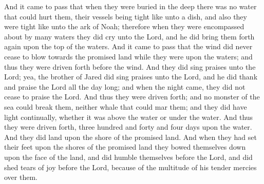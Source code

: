 \bverse \iffalse And it came to pass that when they were buried in the deep there was no water that could hurt them, their vessels being tight like unto a dish, and also they were tight like unto the ark of Noah; therefore when they were encompassed about by many waters they did cry unto the Lord, and he did bring them forth again upon the top of the waters. \fi
And it came to pass that when they were buried in the deep there was no water that could hurt them, their vessels being tight like unto a dish, and also they were tight like unto the ark of Noah; therefore when they were encompassed about by many waters they did cry unto the Lord, and he did bring them forth again upon the top of the waters.
\bverse \iffalse And it came to pass that the wind did never cease to blow towards the promised land while they were upon the waters; and thus they were driven forth before the wind. \fi
And it came to pass that the wind did never cease to blow towards the promised land while they were upon the waters; and thus they were driven forth before the wind.
\bverse \iffalse And they did sing praises unto the Lord; yea, the brother of Jared did sing praises unto the Lord, and he did thank and praise the Lord all the day long; and when the night came, they did not cease to praise the Lord. \fi
And they did sing praises unto the Lord; yea, the brother of Jared did sing praises unto the Lord, and he did thank and praise the Lord all the day long; and when the night came, they did not cease to praise the Lord.
\bverse \iffalse And thus they were driven forth; and no monster of the sea could break them, neither whale that could mar them; and they did have light continually, whether it was above the water or under the water. \fi
And thus they were driven forth; and no monster of the sea could break them, neither whale that could mar them; and they did have light continually, whether it was above the water or under the water.
\bverse \iffalse And thus they were driven forth, three hundred and forty and four days upon the water. \fi
And thus they were driven forth, three hundred and forty and four days upon the water.
\bverse \iffalse And they did land upon the shore of the promised land. And when they had set their feet upon the shores of the promised land they bowed themselves down upon the face of the land, and did humble themselves before the Lord, and did shed tears of joy before the Lord, because of the multitude of his tender mercies over them. \fi
And they did land upon the shore of the promised land. And when they had set their feet upon the shores of the promised land they bowed themselves down upon the face of the land, and did humble themselves before the Lord, and did shed tears of joy before the Lord, because of the multitude of his tender mercies over them.
